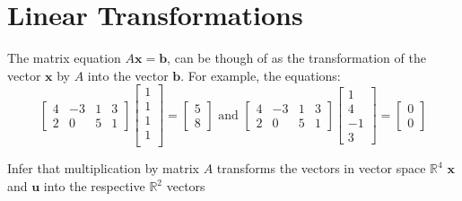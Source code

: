 \documentclass[12pt letter]{report}
\begin{document}
\chapter{Linear Transformations}

The matrix equation $A \mathbf{x} = \mathbf{b}$, can be though of as the transformation of the vector $\mathbf{x}$ by
$A$ into the vector $\mathbf{b}$. For example, the equations:
\[
  \begin{bmatrix} 4 & -3 & 1 & 3 \\ 2 & 0 & 5 & 1 \end{bmatrix} \begin{bmatrix} 1 \\ 1 \\  1\\  1 \\   \end{bmatrix} =
  \begin{bmatrix} 5 \\  8 \end{bmatrix}  \text{ and } \begin{bmatrix} 4 & -3 & 1 & 3 \\ 2 & 0 & 5 & 1 \end{bmatrix}
  \begin{bmatrix} 1 \\  4 \\  -1 \\  3 \end{bmatrix} = \begin{bmatrix} 0 \\  0 \end{bmatrix}
\]

Infer that multiplication by matrix $A$ transforms the vectors in vector space $\mathbb{R}^{4}$ $\mathbf{x}$ and $\mathbf{u}$ into the respective
$\mathbb{R}^{2}$ vectors

\end{document}
